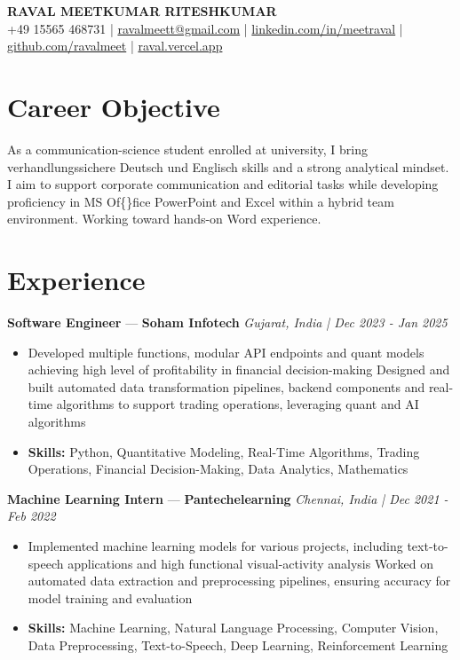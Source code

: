 \documentclass[a4paper,10pt]{article}
\begin{document}
\begin{center}
  {\Large\bfseries RAVAL MEETKUMAR RITESHKUMAR}\\[2pt]
  {\small +49 15565 468731 \;|\; \href{mailto:ravalmeett@gmail.com}{ravalmeett@gmail.com} \;|\; \href{https://www.linkedin.com/in/meetraval/}{linkedin.com/in/meetraval} \;|\; \href{https://github.com/ravalmeet}{github.com/ravalmeet} \;|\; \href{https://raval.vercel.app/}{raval.vercel.app}}
\end{center}
\vspace{-3pt}

\section*{Career Objective}
As a communication-science student enrolled at university, I bring verhandlungssichere Deutsch und Englisch skills and a strong analytical mindset. I aim to support corporate communication and editorial tasks while developing proficiency in MS Of\{\}fice PowerPoint and Excel within a hybrid team environment. Working toward hands-on Word experience.\par

\section*{Experience}
\textbf{Software Engineer} — \textbf{Soham Infotech} \hfill \textit{Gujarat, India \;|\; Dec 2023 - Jan 2025}\par
\vspace{1pt}
\begin{itemize}
  \item Developed multiple functions, modular API endpoints and quant models achieving high level of profitability in financial decision-making Designed and built automated data transformation pipelines, backend components and real-time algorithms to support trading operations, leveraging quant and AI algorithms
  \item \textbf{Skills:} Python, Quantitative Modeling, Real-Time Algorithms, Trading Operations, Financial Decision-Making, Data Analytics, Mathematics
\end{itemize}
\vspace{3pt}
\textbf{Machine Learning Intern} — \textbf{Pantechelearning} \hfill \textit{Chennai, India \;|\; Dec 2021 - Feb 2022}\par
\vspace{1pt}
\begin{itemize}
  \item Implemented machine learning models for various projects, including text-to-speech applications and high functional visual-activity analysis Worked on automated data extraction and preprocessing pipelines, ensuring accuracy for model training and evaluation
  \item \textbf{Skills:} Machine Learning, Natural Language Processing, Computer Vision, Data Preprocessing, Text-to-Speech, Deep Learning, Reinforcement Learning
\end{itemize}
\end{document}
